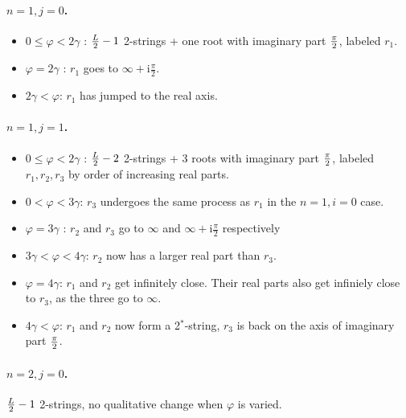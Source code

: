 \documentclass[11pt]{article}
\begin{document}
\paragraph{$n=1, j=0$.}
\begin{itemize}
 \item $0 \leq \varphi < 2\gamma$ : ${L \over 2} -1$ 2-strings + one root with imaginary part $\pi \over 2$, labeled $r_1$.
 \item $\varphi = 2\gamma$ : $r_1$ goes to $\infty + \mathrm{i} \frac{\pi}{2}$.
 \item $2\gamma < \varphi $: $r_1$ has jumped to the real axis.
\end{itemize}

\paragraph{$n=1, j=1$.}
\begin{itemize}
 \item $0 \leq \varphi < 2\gamma$ : ${L \over 2} -2$ 2-strings + $3$ roots with imaginary part $\pi \over 2$, labeled $r_1, r_2, r_3$ by order of increasing real parts.
 \item $0 < \varphi < 3\gamma $: $r_3$ undergoes the same process as $r_1$ in the $n=1, i=0$ case.
  \item $\varphi=3\gamma$ : $r_2$ and $r_3$ go to $\infty$ and $\infty + \mathrm{i} \frac{\pi}{2}$ respectively 
  \item $3\gamma < \varphi < 4 \gamma $: $r_2$ now has a larger real part than $r_3$.
   \item $\varphi = 4\gamma$: $r_1$ and $r_2$ get infinitely close. Their real parts also get infiniely close to $r_3$, as the three go to $\infty$.
     \item $4\gamma < \varphi$: $r_1$ and $r_2$ now form a 2$^{*}$-string, $r_3$ is back on the axis of imaginary part $\pi \over 2$.
   \end{itemize}

\paragraph{$n=2, j=0$.}   
${L \over 2} -1$ 2-strings, no qualitative change when $\varphi$ is varied.
\end{document}
